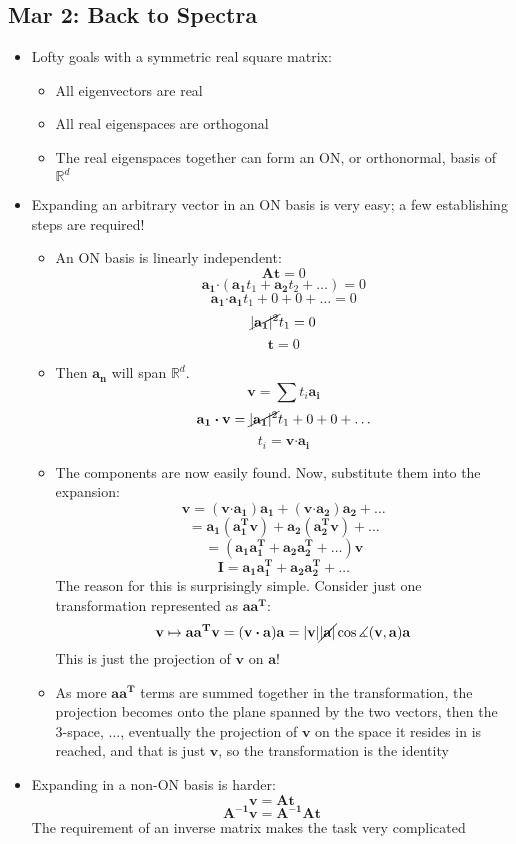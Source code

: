 \documentclass[10pt, oneside]{article}
\newcommand{\R}{\mathbb{R}}
\newcommand{\Cdot}{\boldsymbol{\cdot}}
\renewcommand{\vec}[1]{\mathbf{#1}}
\newcommand{\mat}[1]{\mathbf{#1}}
\begin{document}
\subsection{Mar 2: Back to Spectra}
\begin{itemize}
    \item Lofty goals with a symmetric real square matrix:
    \begin{itemize}
        \item All eigenvectors are real
        \item All real eigenspaces are orthogonal
        \item The real eigenspaces together can form an ON, or orthonormal, basis of $\R^d$
    \end{itemize}
    \item Expanding an arbitrary vector in an ON basis is very easy; a few establishing steps are required! 
    \begin{itemize}
        \item An ON basis is linearly independent:
            \[\mat{A}\vec{t} = 0\]
            \[\vec{a_1} \Cdot (\vec{a_1}t_1 + \vec{a_2}t_2 + \hdots) = 0\]
            \[\vec{a_1}\Cdot\vec{a_1}t_1 + 0 + 0 + \hdots = 0\]
            \[\cancel{|\vec{a_1}|^2} t_1 = 0\]
            \[\vec{t} = 0\]
        \item Then $\vec{a_n}$ will span $\R^d$. 
            \[\vec{v} = \sum t_i \vec{a_i}\]
            \[\vec{a_1} \Cdot \vec{v} = \cancel{|\vec{a_1}|^2} t_1 + 0 + 0 + \hdots\]
            \[t_i = \vec{v} \Cdot \vec{a_i}\]
        \item The components are now easily found. Now, substitute them into the expansion:
            \[\vec{v} = (\vec{v} \Cdot \vec{a_1})\vec{a_1} + (\vec{v} \Cdot \vec{a_2})\vec{a_2} + \hdots\]
            \[= \vec{a_1}(\vec{a_1^T} \vec{v}) + \vec{a_2}(\vec{a_2^T} \vec{v}) + \hdots\]
            \[= (\vec{a_1}\vec{a_1^T} + \vec{a_2}\vec{a_2^T} + \hdots)\vec{v}\]
            \[\mat{I} = \vec{a_1}\vec{a_1^T} + \vec{a_2}\vec{a_2^T} + \hdots\]
            The reason for this is surprisingly simple. Consider just one transformation represented as $\vec{a}\vec{a^T}$:
            \[\vec{v} \mapsto \vec{a}\vec{a^T}\vec{v} = (\vec{v} \Cdot \vec{a})\vec{a} = |\vec{v}|\cancel{|\vec{a}|}\cos\measuredangle(\vec{v},\vec{a})\vec{a}\]
            This is just the projection of $\vec{v}$ on $\vec{a}$!
        \item As more $\vec{a}\vec{a^T}$ terms are summed together in the transformation, the projection becomes onto the plane spanned by the two vectors, then the 3-space, ..., eventually the projection of $\vec{v}$ on the space it resides in is reached, and that is just $\vec{v}$, so the transformation is the identity
        \end{itemize}
    \item Expanding in a non-ON basis is harder:
        \[\vec{v} = \mat{A}\vec{t}\]
        \[\mat{A^{-1}}\mat{v} = \mat{A^{-1}}\mat{A}\mat{t}\]
        The requirement of an inverse matrix makes the task very complicated
\end{itemize}
\end{document}
